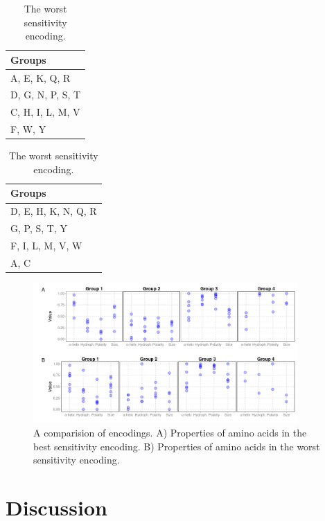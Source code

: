 \documentclass[fleqn,10pt,twoside]{gcb15submission}
\begin{document}
\begin{table}[ht]
\begin{minipage}{.5\linewidth} 
\centering
\begin{tabular}{l}
  \toprule
Groups \\ 
  \midrule
A, E, K, Q, R \\ 
   \rowcolor[gray]{0.85}D, G, N, P, S, T \\ 
  C, H, I, L, M, V \\ 
   \rowcolor[gray]{0.85}F, W, Y \\ 
   \bottomrule
\end{tabular}
\caption{The best sensitivity (final) encoding.} 
\label{tab:best}
\end{minipage}
\begin{minipage}{.5\linewidth} 
\centering
\begin{tabular}{l}
  \toprule
Groups \\ 
  \midrule
D, E, H, K, N, Q, R \\ 
   \rowcolor[gray]{0.85}G, P, S, T, Y \\ 
  F, I, L, M, V, W \\ 
   \rowcolor[gray]{0.85}A, C \\ 
   \bottomrule
\end{tabular}
\caption{The worst sensitivity encoding.} 
\label{tab:worst}
\end{minipage}
\end{table}


\begin{figure}[ht]\centering
\includegraphics[width=0.9\textwidth]{figures/enccomp.png}
\caption{A comparision of encodings. A) Properties of amino acids in the best sensitivity encoding. B) Properties of amino acids in the worst sensitivity encoding.}
\label{fig:enccomp}
\end{figure}

\section*{Discussion}
\end{document}

